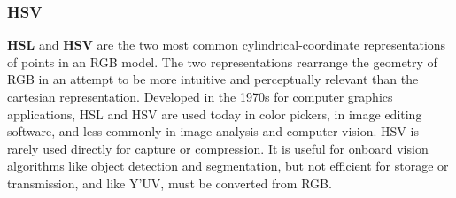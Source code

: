 \subsubsection{HSV}
\textbf{HSL} and \textbf{HSV} are the two most common cylindrical-coordinate representations of points in an RGB model. The two representations rearrange the geometry of RGB in an attempt to be more intuitive and perceptually relevant than the cartesian representation. Developed in the 1970s for computer graphics applications, HSL and HSV are used today in color pickers, in image editing software, and less commonly in image analysis and computer vision.
\nl
HSV is rarely used directly for capture or compression. It is useful for onboard vision algorithms like object detection and segmentation, but not efficient for storage or transmission, and like Y'UV, must be converted from RGB.

